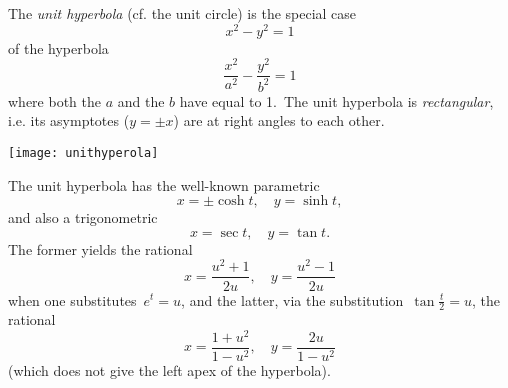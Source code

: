 \documentclass[12pt]{article}
\begin{document}
The {\em unit hyperbola} (cf. the unit circle) is the special case
            $$x^2-y^2 = 1$$
of the hyperbola
         $$\frac{x^2}{a^2}-\frac{y^2}{b^2} = 1$$
where both the  $a$ and the  $b$ have  equal to 1.\, The unit hyperbola is {\em rectangular}, i.e. its asymptotes ($y = \pm x$) are at right angles to each other.
\begin{center}
\texttt{[image: unithyperola]}
\end{center}

The unit hyperbola has the well-known parametric 
      $$x = \pm\cosh{t},  \quad y = \sinh{t},$$
and also a trigonometric 
      $$x = \sec{t},  \quad y = \tan{t}.$$
The former yields the rational 
      $$x = \frac{u^2+1}{2u},  \quad y = \frac{u^2-1}{2u}$$
when one substitutes \,$e^t = u$, and the latter, via the substitution \,$\tan\frac{t}{2} = u$, the rational 
      $$x = \frac{1+u^2}{1-u^2},  \quad y = \frac{2u}{1-u^2}$$
(which does not give the left apex of the hyperbola).
\end{document}
